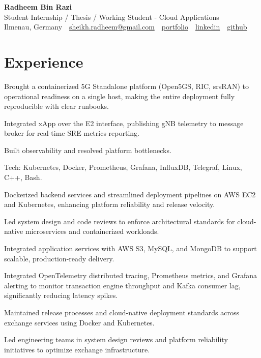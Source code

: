 \documentclass[10pt,a4paper]{resume}
\makeatletter
\newcommand{\Portfolio}{https://radheem.github.io/my-cv}
\newcommand{\PortfolioText}{portfolio}
\newcommand{\GitHub}{https://github.com/radheem}
\newcommand{\LinkedIn}{https://www.linkedin.com/in/radheem-razi}
\newcommand{\Email}{sheikh.radheem@gmail.com}
\makeatother
\begin{document}
\begin{center}
  {\huge\bfseries Radheem Bin Razi}\\[3pt]
  {\large Student Internship / Thesis / Working Student - Cloud Applications}\\[6pt]
  \small
  Ilmenau, Germany \,\textbar\,
  \href{mailto:\Email}{\Email} \,\textbar\,
  \href{\Portfolio}{\PortfolioText} \,\textbar\,
  \href{\LinkedIn}{linkedin} \,\textbar\,
  \href{\GitHub}{github}
\end{center}
\vspace{2pt}

\section{Experience}

\bullets
  \item Brought a containerized 5G Standalone platform (Open5GS, RIC, srsRAN) to operational readiness on a single host, making the entire deployment fully reproducible with clear runbooks.
  \item Integrated xApp over the E2 interface, publishing gNB telemetry to message broker for real-time SRE metrics reporting.
  \item Built observability and resolved platform bottlenecks.
  \item Tech: Kubernetes, Docker, Prometheus, Grafana, InfluxDB, Telegraf, Linux, C++, Bash.
\bulletsend
\vspace{1.5pt}
\bullets
  \item Dockerized backend services and streamlined deployment pipelines on AWS EC2 and Kubernetes, enhancing platform reliability and release velocity.
  \item Led system design and code reviews to enforce architectural standards for cloud-native microservices and containerized workloads.
  \item Integrated application services with AWS S3, MySQL, and MongoDB to support scalable, production-ready delivery.
\bulletsend
\vspace{1.5pt}
\bullets
  \item Integrated OpenTelemetry distributed tracing, Prometheus metrics, and Grafana alerting to monitor transaction engine throughput and Kafka consumer lag, significantly reducing latency spikes.
  \item Maintained release processes and cloud-native deployment standards across exchange services using Docker and Kubernetes.
  \item Led engineering teams in system design reviews and platform reliability initiatives to optimize exchange infrastructure.
\bulletsend
\vspace{1.5pt}
\end{document}
